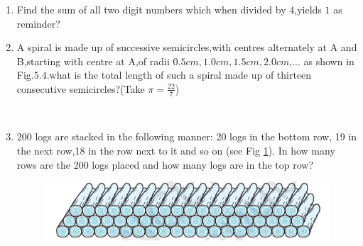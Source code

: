 \begin{enumerate}[label=\thechapter.\arabic*,ref=\thechapter.\theenumi]
\item Find the sum of all two digit numbers which when divided by $4$,yields $1$ as reminder?\\
\solution

\pagebreak

\item A spiral is made up of successive semicircles,with centres alternately at A and B,starting with centre at A,of radii $0.5cm,1.0cm,1.5cm,2.0cm$,... as shown in Fig.$5.4$.what is the total length of such a spiral made up of thirteen consecutive semicircles?(Take $\pi=\frac{22}{7}$)\\
\\
\solution
\pagebreak

\item 200 logs are stacked in the following manner: 20 logs in the bottom row, 19 in the next row,18 in the row next to it and so on (see Fig \ref{fig:10.5.3.19.q}). In how many rows are the 200 logs placed and how many logs are in the top row?
\begin{figure}[h]
    \centering
    \includegraphics[width=1\linewidth]{ncert-maths/10/5/3/19/figs/question.png}
    \caption{ }
    \label{fig:10.5.3.19.q}
\end{figure}
\solution 
\pagebreak


\end{enumerate}
